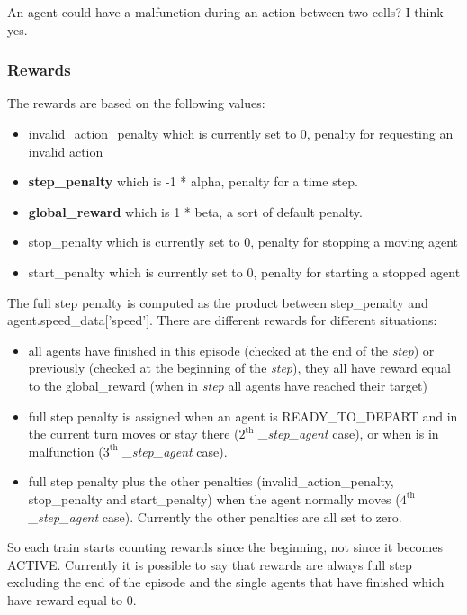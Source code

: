 \documentclass[12pt, a4paper, hidelinks]{article}
\begin{document}
An agent could have a malfunction during an action between two cells? I think yes.

\subsubsection*{Rewards}

The rewards are based on the following values:
\begin{itemize}
	\item invalid\_action\_penalty which is currently set to 0, penalty for requesting an invalid action
	\item \textbf{step\_penalty} which is -1 * alpha, penalty for a time step.
	\item \textbf{global\_reward} which is 1 * beta, a sort of default penalty.
	\item stop\_penalty which is currently set to 0, penalty for stopping a moving agent
	\item start\_penalty which is currently set to 0, penalty for starting a stopped agent
\end{itemize}

The full step penalty is computed as the product between step\_penalty and agent.speed\_data['speed'].
There are different rewards for different situations:

\begin{itemize}
	\item all agents have finished in this episode (checked at the end of the \textit{step}) or previously (checked at the beginning of the \textit{step}), they all have reward equal to the global\_reward (when in \textit{step} all agents have reached their target)
	\item full step penalty is assigned when an agent is READY\_TO\_DEPART and in the current turn moves or stay there ($2^{\text{th}}$ \textit{\_step\_agent} case), or when is in malfunction ($3^{\text{th}}$ \textit{\_step\_agent} case).
	\item full step penalty plus the other penalties (invalid\_action\_penalty, stop\_penalty and start\_penalty) when the agent normally moves ($4^{\text{th}}$ \textit{\_step\_agent} case). Currently the other penalties are all set to zero.
\end{itemize}

So each train starts counting rewards since the beginning, not since it becomes ACTIVE\@.
Currently it is possible to say that rewards are always full step excluding the end of the episode and the single agents that have finished which have reward equal to 0.

\newpage
%
%
\end{document}

